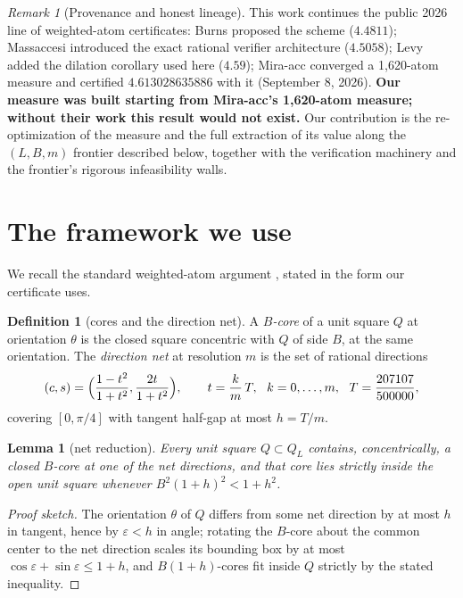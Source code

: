 \documentclass[11pt]{article}
\newtheorem{lemma}[theorem]{Lemma}
\theoremstyle{definition}
\newtheorem{definition}[theorem]{Definition}
\theoremstyle{remark}
\newtheorem{remark}[theorem]{Remark}
\newcommand{\Q}{Q}
\begin{document}
\begin{remark}[Provenance and honest lineage]\label{rem:lineage}
This work continues the public 2026 line of weighted-atom certificates:
Burns \cite{Burns2026} proposed the scheme ($4.4811$); Massaccesi
\cite{Massaccesi2026} introduced the exact rational verifier
architecture ($4.5058$); Levy \cite{Levy2026} added the dilation
corollary used here ($4.59$); Mira-acc \cite{Miraacc2026} converged a
1{,}620-atom measure and certified $4.613028635886$ with it
(September 8, 2026). \textbf{Our measure was built starting from
Mira-acc's 1{,}620-atom measure; without their work this result would
not exist.} Our contribution is the re-optimization of the measure and
the full extraction of its value along the $(L,B,m)$ frontier described
below, together with the verification machinery and the frontier's
rigorous infeasibility walls.
\end{remark}

\section{The framework we use}

We recall the standard weighted-atom argument
\cite{Burns2026,Massaccesi2026,Levy2026,Miraacc2026}, stated in the form
our certificate uses.

\begin{definition}[cores and the direction net]
A \emph{$B$-core} of a unit square $Q$ at orientation $\theta$ is the
closed square concentric with $Q$ of side $B$, at the same orientation.
The \emph{direction net} at resolution $m$ is the set of rational
directions
\[
 (c,s)=\Bigl(\frac{1-t^2}{1+t^2},\frac{2t}{1+t^2}\Bigr),\qquad
 t=\frac{k}{m}\,T,\ \ k=0,\ldots,m,\ \ T=\frac{207107}{500000},
\]
covering $[0,\pi/4]$ with tangent half-gap at most $h=T/m$.
\end{definition}

\begin{lemma}[net reduction]\label{lem:net}
Every unit square $Q\subset\Q_L$ contains, concentrically, a closed
$B$-core at one of the net directions, and that core lies strictly
inside the open unit square whenever
$B^2(1+h)^2<1+h^2$.
\end{lemma}

\begin{proof}[Proof sketch]
The orientation $\theta$ of $Q$ differs from some net direction by at
most $h$ in tangent, hence by $\varepsilon<h$ in angle; rotating the
$B$-core about the common center to the net direction scales its
bounding box by at most $\cos\varepsilon+\sin\varepsilon\le 1+h$, and
$B(1+h)$-cores fit inside $Q$ strictly by the stated inequality.
\end{proof}
\end{document}
